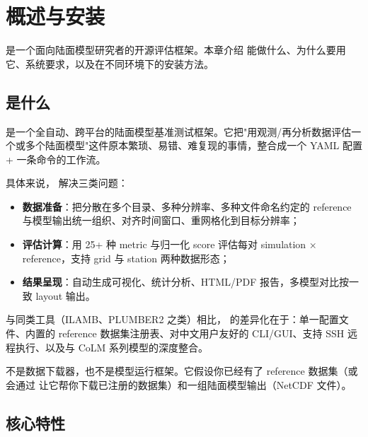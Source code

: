 
\chapter{概述与安装}

\openbench{} 是一个面向陆面模型研究者的开源评估框架。本章介绍 \openbench{} 能做什么、为什么要用它、系统要求，以及在不同环境下的安装方法。

\section{\openbench{} 是什么}

\openbench{} 是一个全自动、跨平台的陆面模型基准测试框架。它把"用观测/再分析数据评估一个或多个陆面模型"这件原本繁琐、易错、难复现的事情，整合成一个 YAML 配置 + 一条命令的工作流。

具体来说，\openbench{} 解决三类问题：

\begin{itemize}
  \item \textbf{数据准备}：把分散在多个目录、多种分辨率、多种文件命名约定的 reference 与模型输出统一组织、对齐时间窗口、重网格化到目标分辨率；
  \item \textbf{评估计算}：用 25+ 种 metric 与归一化 score 评估每对 simulation × reference，支持 grid 与 station 两种数据形态；
  \item \textbf{结果呈现}：自动生成可视化、统计分析、HTML/PDF 报告，多模型对比按一致 layout 输出。
\end{itemize}

与同类工具（ILAMB、PLUMBER2 之类）相比，\openbench{} 的差异化在于：单一配置文件、内置的 reference 数据集注册表、对中文用户友好的 CLI/GUI、支持 SSH 远程执行、以及与 CoLM 系列模型的深度整合。

\begin{noteBox}
\openbench{} 不是数据下载器，也不是模型运行框架。它假设你已经有了 reference 数据集（或会通过  让它帮你下载已注册的数据集）和一组陆面模型输出（NetCDF 文件）。
\end{noteBox}

\section{核心特性}

